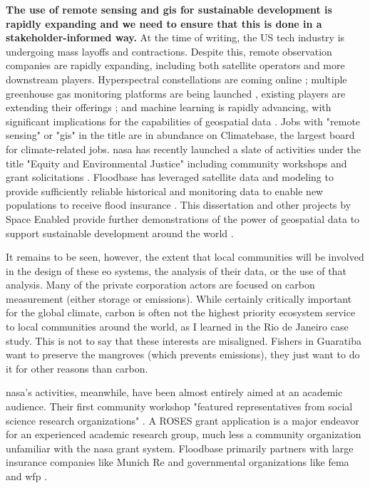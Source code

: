 \textbf{The use of remote sensing and \ac{gis} for sustainable development is rapidly expanding and we need to ensure that this is done in a stakeholder-informed way.} At the time of writing, the US tech industry is undergoing mass layoffs and contractions. Despite this, remote observation companies are rapidly expanding, including both satellite operators and more downstream players. Hyperspectral constellations are coming online \cite{planetlabspbcPlanetAnnouncesNew2022, rainbowPixxelRaises252022}; multiple greenhouse gas monitoring platforms are being launched \cite{clarkExclusiveSatelliteImages2022, brownSecurityCameraPlanet2023}, existing players are extending their offerings \cite{jewettPlanetDebutsPlanetary2022}; and machine learning is rapidly advancing, with significant implications for the capabilities of geospatial data \cite{joyceCanYouUse2023}. Jobs with "remote sensing" or "\ac{gis}" in the title are in abundance on Climatebase, the largest board for climate-related jobs. \ac{nasa} has recently launched a slate of activities under the title "Equity and Environmental Justice" including community workshops and grant solicitations \cite{bollesEquityEnvironmentalJustice2021}. Floodbase has leveraged satellite data and modeling to provide sufficiently reliable historical and monitoring data to enable new populations to receive flood insurance \cite{tellmanRegionalIndexInsurance2022}. This dissertation and other projects by Space Enabled provide further demonstrations of the power of geospatial data to support sustainable development around the world \cite{lombardoDevelopmentDecisionSupport2021, lombardoEnvironmentVulnerabilityDecisionTechnologyFrameworkDecision2022, ovienmhadaInclusiveDesignEarth2021, ovienmhadaEnvironmentVulnerabilityDecisionTechnologyModelingFramework2021}. 

It remains to be seen, however, the extent that local communities will be involved in the design of these \ac{eo} systems, the analysis of their data, or the use of that analysis. Many of the private corporation actors are focused on carbon measurement (either storage or emissions). While certainly critically important for the global climate, carbon is often not the highest priority ecosystem service to local communities around the world, as I learned in the Rio de Janeiro case study. This is not to say that these interests are misaligned. Fishers in Guaratiba want to preserve the mangroves (which prevents emissions), they just want to do it for other reasons than carbon. 

\ac{nasa}'s activities, meanwhile, have been almost entirely aimed at an academic audience. Their first community workshop "featured representatives from social science research organizations" \cite{bollesEquityEnvironmentalJustice2021}. A ROSES grant application is a major endeavor for an experienced academic research group, much less a community organization unfamiliar with the \ac{nasa} grant system. Floodbase primarily partners with large insurance companies like Munich Re and governmental organizations like \ac{fema} and \ac{wfp} \cite{floodbaseFloodMonitoringSudan2022, floodbaseAnnouncingOurWork2023, rostonClimateStartupAims2023}.


